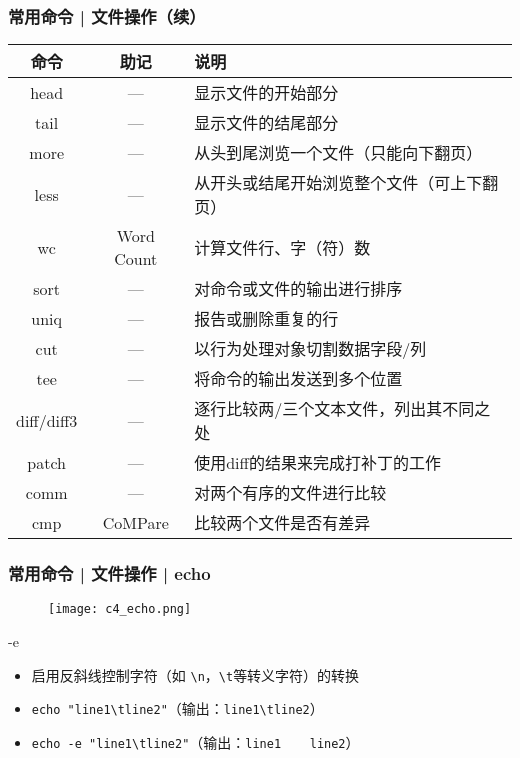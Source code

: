 \begin{frame}
  \frametitle{常用命令 | \alert{文件操作（续）}}
  \begin{table}
    \centering
    \begin{tabularx}{\textwidth}{ccX}
      \hline
      \rowcolor{blue!50}命令 & 助记 & 说明\\
      \hline
      head & --- & 显示文件的开始部分\\
      tail & --- & 显示文件的结尾部分\\
      more & --- & 从头到尾浏览一个文件（只能向下翻页）\\
      less & --- & \footnotesize{从开头或结尾开始浏览整个文件（可上下翻页）}\\
      wc & Word Count & 计算文件行、字（符）数\\
      sort & --- & 对命令或文件的输出进行排序\\
      uniq & --- & 报告或删除重复的行\\
      cut & --- & 以行为处理对象切割数据字段/列\\
      tee & --- & 将命令的输出发送到多个位置\\
      diff/diff3 & --- & 逐行比较两/三个文本文件，列出其不同之处\\
      patch & --- & 使用diff的结果来完成打补丁的工作\\
      comm & --- & 对两个有序的文件进行比较\\
      cmp & CoMPare & 比较两个文件是否有差异\\
      \hline
    \end{tabularx}
  \end{table}
\end{frame}

\begin{frame}[fragile]
  \frametitle{常用命令 | 文件操作 | echo}
  \begin{figure}
    \centering
    \texttt{[image: c4\_echo.png]}
  \end{figure}
  \pause
  \begin{block}{\alert{-e}}
    \begin{itemize}
      \item 启用反斜线控制字符（如 \verb|\n|，\verb|\t|等转义字符）的转换
      \item \verb|echo "line1\tline2"|（输出：\verb|line1\tline2|）
      \item \verb|echo -e "line1\tline2"|（输出：\verb|line1    line2|）
    \end{itemize}
  \end{block}
\end{frame}

